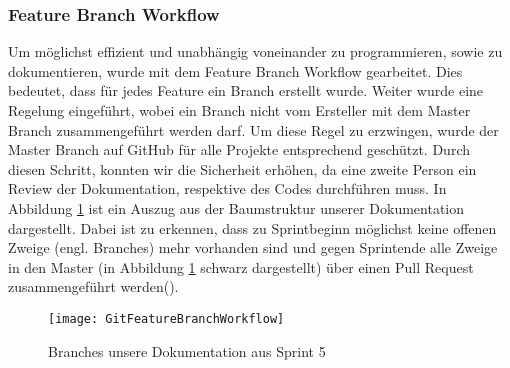 \subsubsection{Feature Branch Workflow}
Um möglichst effizient und unabhängig voneinander zu programmieren, sowie zu dokumentieren, wurde mit dem Feature Branch Workflow gearbeitet. Dies bedeutet, dass für jedes Feature ein Branch erstellt wurde. Weiter wurde eine Regelung eingeführt, wobei ein Branch nicht vom Ersteller mit dem Master Branch zusammengeführt werden darf. Um diese Regel zu erzwingen, wurde der Master Branch auf GitHub für alle Projekte entsprechend geschützt. Durch diesen Schritt, konnten wir die Sicherheit erhöhen, da eine zweite Person ein Review der Dokumentation, respektive des Codes durchführen muss.
In Abbildung \ref{fig:FeatureBranchWorkflow} ist ein Auszug aus der Baumstruktur unserer Dokumentation dargestellt. Dabei ist zu erkennen, dass zu Sprintbeginn möglichst keine offenen Zweige (engl. Branches) mehr vorhanden sind und gegen Sprintende alle Zweige in den Master (in Abbildung \ref{fig:FeatureBranchWorkflow} schwarz dargestellt) über einen Pull Request zusammengeführt werden(\cite{BaumannWicki2018}).

\begin{figure}[htb]
	\center
	\texttt{[image: GitFeatureBranchWorkflow]}
	\caption{Branches unsere Dokumentation aus Sprint 5}
	\label{fig:FeatureBranchWorkflow}
\end{figure}
